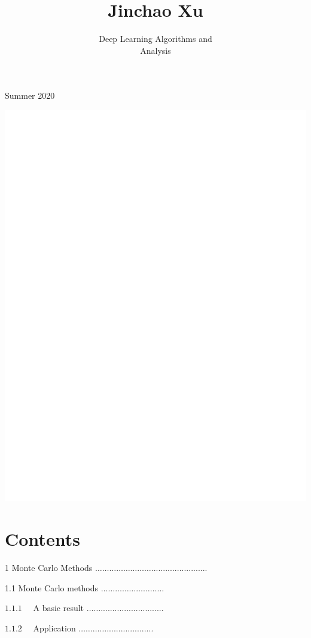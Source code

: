 \documentclass[10pt]{article}
\title{Jinchao Xu }
\author{Deep Learning Algorithms and\\
Analysis}
\date{}
\begin{document}
\maketitle

Summer 2020

\includegraphics[max width=\textwidth]{2022_01_05_5a7d88a0a7ec0275e0bbg-02}

\section{Contents}
1 Monte Carlo Methods $\ldots \ldots \ldots \ldots \ldots \ldots \ldots \ldots . . . . . . . . . . . . . . . . . . . . . . . .$

1.1 Monte Carlo methods $\ldots \ldots \ldots \ldots \ldots \ldots \ldots \ldots \ldots$

$1.1 .1 \quad$ A basic result $\ldots \ldots . . . . . . . . . . . . . . . . . . . . . . . . . . .$

$1.1 .2 \quad$ Application $\ldots \ldots \ldots \ldots . . . . . . . . . . . . . . . . . . . .$
\end{document}
